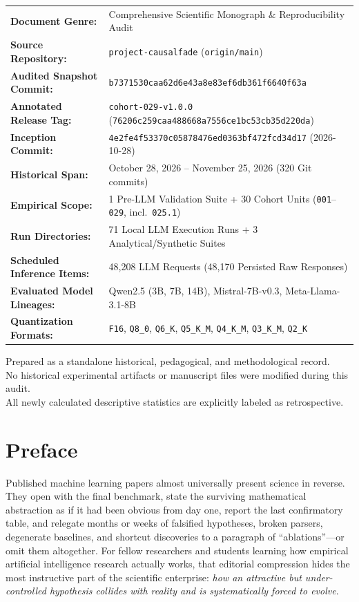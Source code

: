 \begin{titlepage}
{\footnotesize
\begin{tabular}{@{}p{4.3cm}p{10.8cm}@{}}
\textbf{Document Genre:} & Comprehensive Scientific Monograph \& Reproducibility Audit \\
\textbf{Source Repository:} & \texttt{project-causalfade} (\texttt{origin/main}) \\
\textbf{Audited Snapshot Commit:} & \nolinkurl{b7371530caa62d6e43a8e83ef6db361f6640f63a} \\
\textbf{Annotated Release Tag:} & \texttt{cohort-029-v1.0.0} (\nolinkurl{76206c259caa488668a7556ce1bc53cb35d220da}) \\
\textbf{Inception Commit:} & \nolinkurl{4e2fe4f53370c05878476ed0363bf472fcd34d17} (2026-10-28) \\
\textbf{Historical Span:} & October 28, 2026 -- November 25, 2026 (320 Git commits) \\
\textbf{Empirical Scope:} & 1 Pre-LLM Validation Suite + 30 Cohort Units (\texttt{001}--\texttt{029}, incl.\ \texttt{025.1}) \\
\textbf{Run Directories:} & 71 Local LLM Execution Runs + 3 Analytical/Synthetic Suites \\
\textbf{Scheduled Inference Items:} & 48,208 LLM Requests (48,170 Persisted Raw Responses) \\
\textbf{Evaluated Model Lineages:} & Qwen2.5 (3B, 7B, 14B), Mistral-7B-v0.3, Meta-Llama-3.1-8B \\
\textbf{Quantization Formats:} & \texttt{F16}, \texttt{Q8\_0}, \texttt{Q6\_K}, \texttt{Q5\_K\_M}, \texttt{Q4\_K\_M}, \texttt{Q3\_K\_M}, \texttt{Q2\_K}
\end{tabular}
}

\vfill
{\footnotesize\color{cfslate}
Prepared as a standalone historical, pedagogical, and methodological record.\\
No historical experimental artifacts or manuscript files were modified during this audit.\\
All newly calculated descriptive statistics are explicitly labeled as retrospective.\par}
\end{titlepage}

\chapter*{Preface}

Published machine learning papers almost universally present science in reverse. They open with the final benchmark, state the surviving mathematical abstraction as if it had been obvious from day one, report the last confirmatory table, and relegate months or weeks of falsified hypotheses, broken parsers, degenerate baselines, and shortcut discoveries to a paragraph of ``ablations''---or omit them altogether. For fellow researchers and students learning how empirical artificial intelligence research actually works, that editorial compression hides the most instructive part of the scientific enterprise: \emph{how an attractive but under-controlled hypothesis collides with reality and is systematically forced to evolve}.

